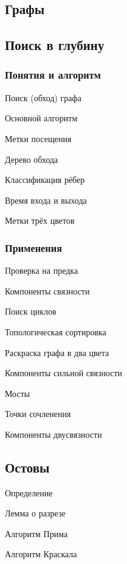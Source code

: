 \documentclass[a4paper,12pt]{article}
\begin{document}
\begin{multicols}{2}
  \section{Графы}

    \subsection{Поиск в глубину}

      \subsubsection{Понятия и алгоритм}
        \begin{compactenum}
          \item Поиск (обход) графа
          \item Основной алгоритм
          \item Метки посещения
          \item Дерево обхода
          \item Классификация рёбер
          \item Время входа и выхода
          \item Метки трёх цветов
        \end{compactenum}

      \subsubsection{Применения}
        \begin{compactenum}
          \item Проверка на предка
          \item Компоненты связности
          \item Поиск циклов
          \item Топологическая сортировка
          \item Раскраска графа в два цвета
          \item Компоненты сильной связности
          \item Мосты
          \item Точки сочленения
          \item Компоненты двусвязности
        \end{compactenum}
 
    \subsection{Остовы}
      \begin{compactenum}
        \item Определение
        \item Лемма о разрезе
        \item Алгоритм Прима
        \item Алгоритм Краскала
      \end{compactenum}


\end{multicols}
\end{document}
